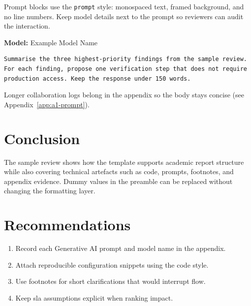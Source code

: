 \documentclass[12pt, a4paper]{article}
\begin{document}
Prompt blocks use the \texttt{prompt} style: monospaced text, framed
background, and no line numbers. Keep model details next to the prompt
so reviewers can audit the interaction.

\textbf{Model:} Example Model Name

\begin{lstlisting}[style=prompt]
Summarise the three highest-priority findings from the sample review.
For each finding, propose one verification step that does not require
production access. Keep the response under 150 words.
\end{lstlisting}

Longer collaboration logs belong in the appendix so the body stays concise
(see Appendix~\ref{app:a1-prompt}).


\section{Conclusion}
\label{sec:conclusion}

The sample review shows how the template supports academic report structure
while also covering technical artefacts such as code, prompts, footnotes,
and appendix evidence. Dummy values in the preamble can be replaced without
changing the formatting layer.


\section{Recommendations}
\label{sec:recommendations}

\begin{enumerate}[leftmargin=1.5em]
  \item Record each Generative AI prompt and model name in the appendix.
  \item Attach reproducible configuration snippets using the code style.
  \item Use footnotes for short clarifications that would interrupt flow.
  \item Keep \gls{sla} assumptions explicit when ranking impact.
\end{enumerate}


\newpage
\renewcommand{\refname}{Reference List}

\end{document}
